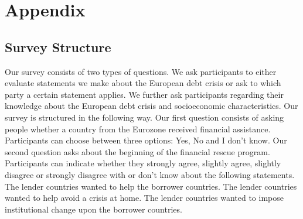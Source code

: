 \section{Appendix}
\subsection{Survey Structure}
Our survey consists of two types of questions. We ask participants to either evaluate statements we make about the European debt crisis or ask to which party a certain statement applies. We further ask participants regarding their knowledge about the European debt crisis and socioeconomic characteristics. Our survey is structured in the following way. Our first question consists of asking people whether a country from the Eurozone received financial assistance. Participants can choose between three options: Yes, No and I don't know. Our second question asks about the beginning of the financial rescue program. 
Participants can indicate whether they strongly agree, slightly agree, slightly disagree or strongly disagree with or don't know about the following statements. 
The lender countries wanted to help the borrower countries. The lender countries wanted to help avoid a crisis at home. The lender countries wanted to impose institutional change upon the borrower countries. 
